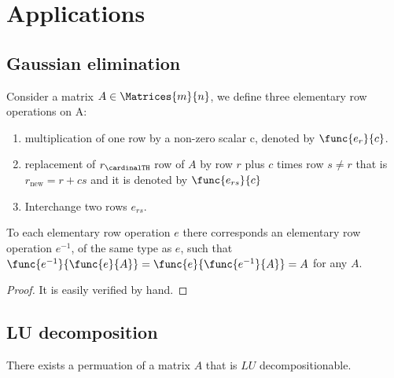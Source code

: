 \thispagestyle{headings}
\section{Applications}
\subsection{Gaussian elimination}
\begin{definition}
    Consider a matrix \(A \in \Matrices{m}{n}\), we define three elementary row operations on A:
\begin{enumerate}
    \item multiplication of one row by a non-zero scalar c, denoted by \(\func{e_r}{c}\).
    \item replacement of \(r_\cardinalTH\) row of \(A\) by row \(r\) plus \(c\) times row \(s \neq r\) that is \(r_{\text{new}} = r + cs\) and it is denoted by \(\func{e_{rs}}{c}\)
    \item Interchange two rows \(e_{rs}\).
\end{enumerate}

\end{definition}

\begin{theorem}
    To each elementary row operation \(e\) there corresponds an elementary row operation \(e^{-1}\), of the same type as \(e\), such that \(\func{e^{-1}}{\func{e}{A}} = \func{e}{\func{e^{-1}}{A}} = A\) for any \(A\).
\end{theorem}

\begin{proof}
    It is easily verified by hand.
\end{proof}
\subsection{LU decomposition}

\begin{theorem}
    There exists a permuation of a matrix \(A\) that is \(LU\) decompositionable.
\end{theorem}